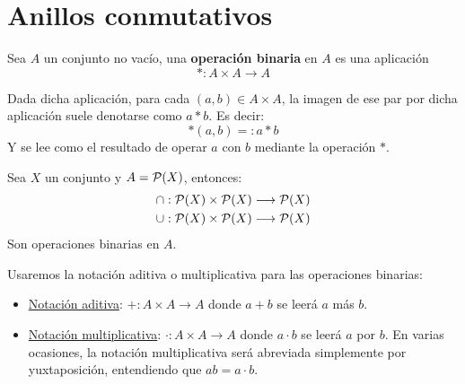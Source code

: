 \chapter{Anillos conmutativos}

\begin{definicion}
    Sea $A$ un conjunto no vacío, una \textbf{operación binaria} en $A$ es una aplicación $$\ast:A\times A \longrightarrow A$$
\end{definicion}

Dada dicha aplicación, para cada $(a,b) \in A \times A$, la imagen de ese par por dicha aplicación suele denotarse como $a * b$.
Es decir:
$$\ast(a,b) =: a \ast b$$
Y se lee como el resultado de operar $a$ con $b$ mediante la operación $*$.

\begin{ejemplo}
    Sea $X$ un conjunto y $A = \mathcal{P}(X)$, entonces:
    \begin{gather*}
        \cap:\mathcal{P}(X)\times \mathcal{P}(X)\longrightarrow \mathcal{P}(X) \\
        \cup:\mathcal{P}(X)\times \mathcal{P}(X)\longrightarrow \mathcal{P}(X)
    \end{gather*}
    Son operaciones binarias en $A$.
\end{ejemplo}


Usaremos la notación aditiva o multiplicativa para las operaciones binarias:
\begin{itemize}
    \item \underline{Notación aditiva}: $+:A\times A\longrightarrow A$ donde $a + b$ se leerá $a$ más $b$.
    \item \underline{Notación multiplicativa}: $\cdot:A\times A\longrightarrow A$ donde $a \cdot b$ se leerá $a$ por $b$.
        En varias ocasiones, la notación multiplicativa será abreviada simplemente por yuxtaposición, entendiendo que $ab = a\cdot b$.
\end{itemize}

